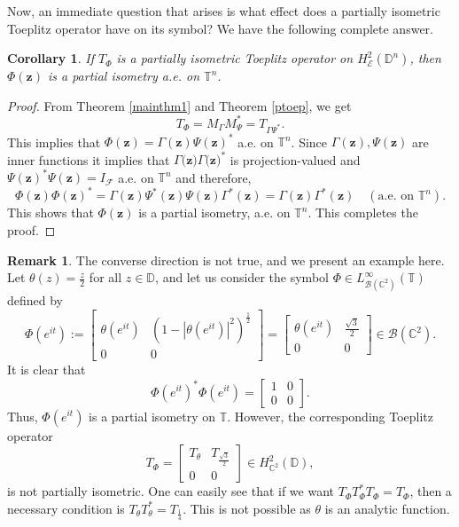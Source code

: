 \documentclass[12pt]{amsart}
\newtheorem{cor}[propn]{Corollary}
\theoremstyle{definition}
\newtheorem{rem}{Remark}[section]
\newcommand{\D}{\mathbb{D}}
\newcommand{\1}{{\mbox{\bf 1}}}
\newcommand{\clb}{\mathcal{B}}
\newcommand{\cle}{\mathcal{E}}
\newcommand{\clf}{\mathcal{F}}
\begin{document}
Now, an immediate question that arises is what effect does a partially isometric Toeplitz operator have on its symbol? We have the following complete answer.
\begin{cor}\label{symb}
If $T_{\Phi}$ is a partially isometric Toeplitz operator on $H_{\cle}^2(\D^n)$, then $\Phi(\bm{z})$ is a partial isometry a.e. on $\mathbb{T}^n$.
\end{cor}
\begin{proof}
From Theorem \ref{mainthm1} and Theorem \ref{ptoep}, we get 
\[
T_{\Phi} = M_{\Gamma} M_{\Psi}^* = T_{\Gamma \Psi^*}.
\]
This implies that $\Phi(\bm{z}) = \Gamma(\bm{z}) \Psi(\bm{z})^*$ a.e. on $\mathbb{T}^n$. Since $\Gamma(\bm{z}), \Psi(\bm{z})$ are inner functions it implies that $\Gamma(\bm{z)} \Gamma(\bm{z)}^*$ is projection-valued and $\Psi(\bm{z})^* \Psi(\bm{z}) = I_{\clf}$ a.e. on $\mathbb{T}^n$ and therefore, 
\[
\Phi(\bm{z})\Phi(\bm{z})^* = \Gamma(\bm{z}) \Psi^*(\bm{z}) \Psi(\bm{z}) \Gamma^*(\bm{z}) = \Gamma(\bm{z}) \Gamma^*(\bm{z})  \quad (\text{a.e.  on } \mathbb{T}^n).
\]
This shows that $\Phi(\bm{z})$ is a partial isometry, a.e. on $\mathbb{T}^n$. This completes the proof.
\end{proof}
\begin{rem}
The converse direction is not true, and we present an example here. Let $\theta(z) = \frac{z}{2}$ for all $z \in \D$, and let us consider the symbol $\Phi \in L_{\clb(\mathbb{C}^2)}^{\infty}(\mathbb{T})$ defined by 
\[
\Phi(e^{it}) := \begin{bmatrix}
\theta(e^{it}) & (1 - |\theta(e^{it})|^2)^{\frac{1}{2}}\\
0 & 0
\end{bmatrix}  =  \begin{bmatrix}
\theta(e^{it}) & \frac{\sqrt{3}}{2}\\
0 & 0
\end{bmatrix}\in \clb(\mathbb{C}^2).
\]
It is clear that 
\[
\Phi(e^{it})^* \Phi(e^{it}) = \begin{bmatrix}
1 & 0\\
0 & 0
\end{bmatrix}.
\]
Thus, $\Phi(e^{it})$ is a partial isometry on $\mathbb{T}$. However, the corresponding Toeplitz operator
\[
T_{\Phi} = \begin{bmatrix}
T_{\theta} & T_{\frac{\sqrt{3}}{2}}\\
0 & 0
\end{bmatrix} \in H_{\mathbb{C}^2}^2(\D),
\]
is not partially isometric. One can easily see that if we want $T_{\Phi} T_{\Phi}^* T_{\Phi} = T_{\Phi}$, then a necessary condition is $T_{\theta} T_{\theta}^* = T_{\frac{1}{4}}$. This is not possible as $\theta$ is an analytic function.
\end{rem}
\end{document}
